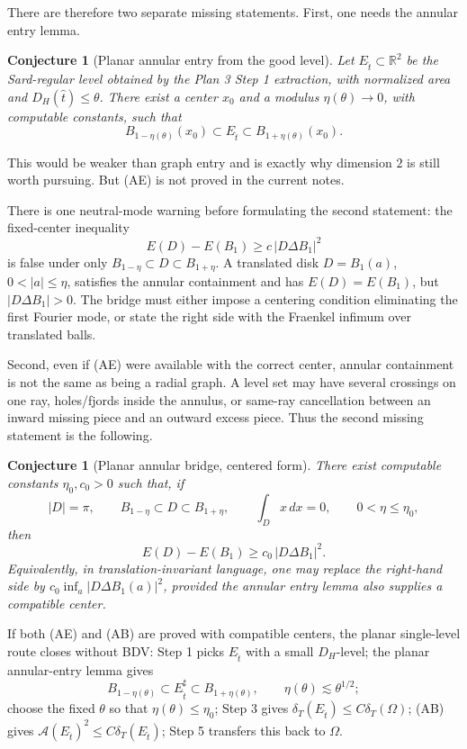\documentclass[11pt]{article}
\newtheorem{conjecture}[theorem]{Conjecture}
\newcommand{\Om}{\Omega}
\newcommand{\R}{\mathbb R}
\newcommand{\cA}{\mathcal A}
\begin{document}
There are therefore two separate missing statements.  First, one needs the
annular entry lemma.

\begin{conjecture}[Planar annular entry from the good level]
Let \(E_{\hat t}\subset\R^2\) be the Sard-regular level obtained by the
Plan 3 Step 1 extraction, with normalized area and \(D_H(\hat t)\le\theta\).
There exist a center \(x_0\) and a modulus \(\eta(\theta)\to0\), with
computable constants, such that
\[
   B_{1-\eta(\theta)}(x_0)\subset E_{\hat t}
      \subset B_{1+\eta(\theta)}(x_0).
   \tag{AE}
\]
\end{conjecture}

This would be weaker than graph entry and is exactly why dimension \(2\) is
still worth pursuing.  But (AE) is not proved in the current notes.

There is one neutral-mode warning before formulating the second statement:
the fixed-center inequality
\[
   E(D)-E(B_1)\ge c\,|D\Delta B_1|^2
\]
is false under only \(B_{1-\eta}\subset D\subset B_{1+\eta}\).  A translated
disk \(D=B_1(a)\), \(0<|a|\le\eta\), satisfies the annular containment and
has \(E(D)=E(B_1)\), but \(|D\Delta B_1|>0\).  The bridge must either impose
a centering condition eliminating the first Fourier mode, or state the
right side with the Fraenkel infimum over translated balls.

Second, even if (AE) were available with the correct center, annular
containment is not the same as being a radial graph.  A level set may have
several crossings on one ray, holes/fjords inside the annulus, or same-ray
cancellation between an inward missing piece and an outward excess piece.
Thus the second missing statement is the following.

\begin{conjecture}[Planar annular bridge, centered form]
There exist computable constants \(\eta_0,c_0>0\) such that, if
\[
   |D|=\pi,\qquad B_{1-\eta}\subset D\subset B_{1+\eta},
   \qquad \int_D x\,dx=0,\qquad 0<\eta\le\eta_0,
\]
then
\[
   E(D)-E(B_1)\ge c_0\,|D\Delta B_1|^2 .
   \tag{AB}
\]
Equivalently, in translation-invariant language, one may replace the
right-hand side by \(c_0\inf_a |D\Delta B_1(a)|^2\), provided the annular
entry lemma also supplies a compatible center.
\end{conjecture}

If both (AE) and (AB) are proved with compatible centers, the planar
single-level route closes without BDV: Step 1 picks \(E_{\hat t}\) with a
small \(D_H\)-level; the planar annular-entry lemma gives
\[
   B_{1-\eta(\theta)}\subset E_{\hat t}^{\sharp}\subset B_{1+\eta(\theta)},
   \qquad \eta(\theta)\lesssim \theta^{1/2};
\]
choose the fixed \(\theta\) so that \(\eta(\theta)\le\eta_0\); Step 3 gives
\(\delta_T(E_{\hat t})\le C\delta_T(\Om)\); (AB) gives
\(\cA(E_{\hat t})^2\le C\delta_T(E_{\hat t})\); Step 5 transfers this back
to \(\Om\).
\end{document}
